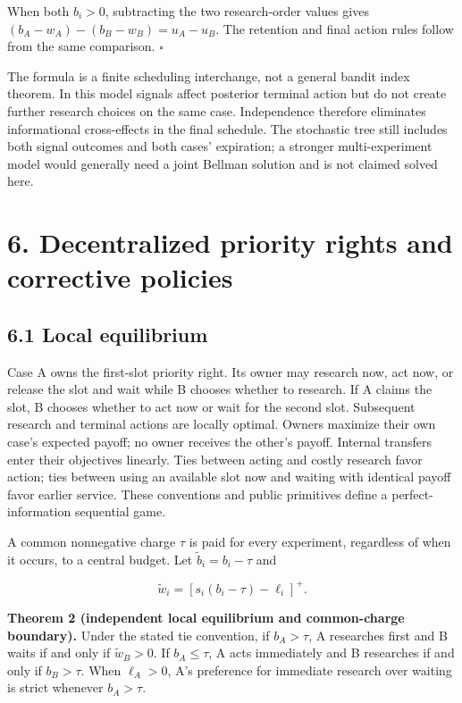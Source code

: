 \documentclass[
  11pt,
]{article}
\begin{document}
When both \(b_i>0\), subtracting the two research-order values gives
\((b_A-w_A)-(b_B-w_B)=u_A-u_B\). The retention and final action rules
follow from the same comparison. \(\square\)

The formula is a finite scheduling interchange, not a general bandit
index theorem. In this model signals affect posterior terminal action
but do not create further research choices on the same case.
Independence therefore eliminates informational cross-effects in the
final schedule. The stochastic tree still includes both signal outcomes
and both cases' expiration; a stronger multi-experiment model would
generally need a joint Bellman solution and is not claimed solved here.

\section{6. Decentralized priority rights and corrective
policies}\label{decentralized-priority-rights-and-corrective-policies}

\subsection{6.1 Local equilibrium}\label{local-equilibrium}

Case A owns the first-slot priority right. Its owner may research now,
act now, or release the slot and wait while B chooses whether to
research. If A claims the slot, B chooses whether to act now or wait for
the second slot. Subsequent research and terminal actions are locally
optimal. Owners maximize their own case's expected payoff; no owner
receives the other's payoff. Internal transfers enter their objectives
linearly. Ties between acting and costly research favor action; ties
between using an available slot now and waiting with identical payoff
favor earlier service. These conventions and public primitives define a
perfect-information sequential game.

A common nonnegative charge \(\tau\) is paid for every experiment,
regardless of when it occurs, to a central budget. Let
\(\tilde b_i=b_i-\tau\) and

\[\tilde w_i=[s_i(b_i-\tau)-\ell_i]^+.\]

\textbf{Theorem 2 (independent local equilibrium and common-charge
boundary).} Under the stated tie convention, if \(b_A>\tau\), A
researches first and B waits if and only if \(\tilde w_B>0\). If
\(b_A\leq\tau\), A acts immediately and B researches if and only if
\(b_B>\tau\). When \(\ell_A>0\), A's preference for immediate research
over waiting is strict whenever \(b_A>\tau\).
\end{document}
